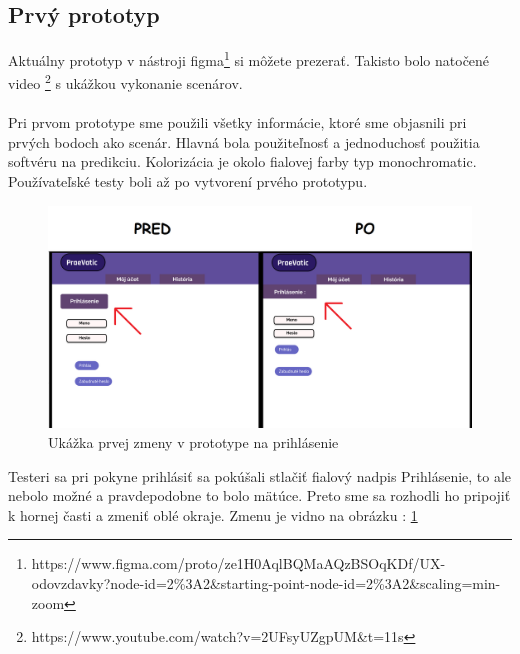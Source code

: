 \subsection{Prvý prototyp}

Aktuálny prototyp v nástroji figma\footnote{https://www.figma.com/proto/ze1H0AqlBQMaAQzBSOqKDf/UX-odovzdavky?node-id=2\%3A2\&starting-point-node-id=2\%3A2\&scaling=min-zoom} si môžete prezerať.  
Takisto bolo natočené video \footnote{https://www.youtube.com/watch?v=2UFsyUZgpUM\&t=11s} s ukážkou vykonanie scenárov.
\\ \\
Pri prvom prototype sme použili všetky informácie, ktoré sme objasnili pri prvých bodoch ako scenár. Hlavná bola použiteľnosť a jednoduchosť použitia softvéru na predikciu. Kolorizácia je okolo fialovej farby typ monochromatic. Používateľské testy boli až po vytvorení prvého prototypu. 


\begin{figure}[h!]
	
	\includegraphics[width=.9\textwidth]{figures/predtym}
	
	\centering
	
	\caption{ Ukážka prvej zmeny v prototype na prihlásenie\label{predtym}}
	
	
	
\end{figure}


Testeri sa pri pokyne prihlásiť sa pokúšali stlačiť fialový nadpis Prihlásenie, to ale nebolo možné a pravdepodobne to bolo mätúce. Preto sme sa rozhodli ho pripojiť k hornej časti a zmeniť oblé okraje. Zmenu je vidno na obrázku : \ref{predtym}


